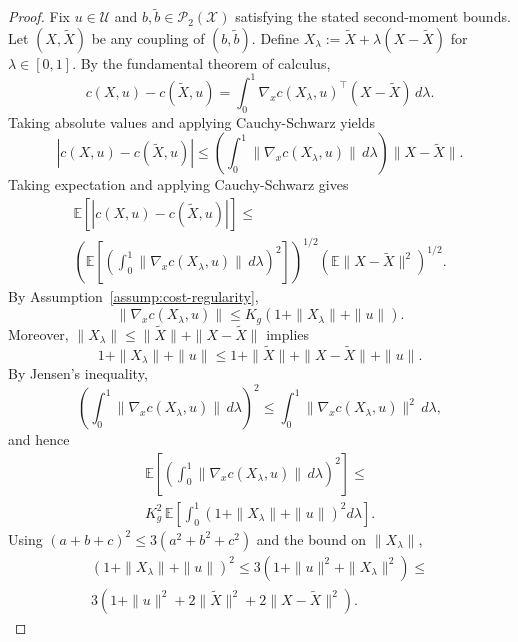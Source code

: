 \documentclass[letterpaper, 10 pt, conference]{ieeeconf}
\begin{document}
\begin{proof}
Fix $u\in\mathcal{U}$ and $b,\tilde b\in\mathcal{P}_2(\mathcal{X})$ satisfying the stated second-moment bounds.
Let $(X,\tilde X)$ be any coupling of $(b,\tilde b)$.
Define $X_\lambda:=\tilde X+\lambda(X-\tilde X)$ for $\lambda\in[0,1]$.
By the fundamental theorem of calculus,
\begin{equation}
c(X,u)-c(\tilde X,u)
=
\int_0^1 \nabla_x c(X_\lambda,u)^\top (X-\tilde X)\,d\lambda.
\end{equation}
Taking absolute values and applying Cauchy-Schwarz yields
\begin{equation}
|c(X,u)-c(\tilde X,u)|
\le
\left(\int_0^1 \|\nabla_x c(X_\lambda,u)\|\,d\lambda\right)\|X-\tilde X\|.
\end{equation}
Taking expectation and applying Cauchy-Schwarz gives
\begin{multline}
\mathbb{E}\!\left[|c(X,u)-c(\tilde X,u)|\right]
\le \\
\left(
\mathbb{E}\!\left[\left(\int_0^1 \|\nabla_x c(X_\lambda,u)\|\,d\lambda\right)^2\right]
\right)^{\!1/2}
\left(\mathbb{E}\|X-\tilde X\|^2\right)^{\!1/2}.
\end{multline}
By Assumption~\ref{assump:cost-regularity},
\begin{equation}
\|\nabla_x c(X_\lambda,u)\|
\le
K_g\left(1+\|X_\lambda\|+\|u\|\right).
\end{equation}
Moreover, $\|X_\lambda\|\le \|\tilde X\|+\|X-\tilde X\|$ implies
\begin{equation}
1+\|X_\lambda\|+\|u\|
\le
1+\|\tilde X\|+\|X-\tilde X\|+\|u\|.
\end{equation}
By Jensen's inequality,
\begin{equation}
\left(\int_0^1 \|\nabla_x c(X_\lambda,u)\|\,d\lambda\right)^2
\le
\int_0^1 \|\nabla_x c(X_\lambda,u)\|^2\,d\lambda,
\end{equation}
and hence
\begin{multline}
\mathbb{E}\!\left[\left(\int_0^1 \|\nabla_x c(X_\lambda,u)\|\,d\lambda\right)^2\right]
\le \\
K_g^2\,
\mathbb{E}\!\left[
\int_0^1 \left(1+\|X_\lambda\|+\|u\|\right)^2 d\lambda
\right].
\end{multline}
Using $(a+b+c)^2\le 3(a^2+b^2+c^2)$ and the bound on $\|X_\lambda\|$,
\begin{multline}
\left(1+\|X_\lambda\|+\|u\|\right)^2
\le
3\left(1+\|u\|^2+\|X_\lambda\|^2\right)
\le \\
3\left(1+\|u\|^2+2\|\tilde X\|^2+2\|X-\tilde X\|^2\right).

\end{multline}
\end{proof}
\end{document}
